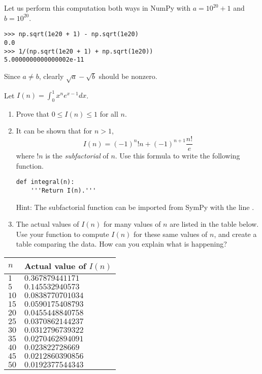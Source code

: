 Let us perform this computation both ways in NumPy with $a=10^20+1$ and $b=10^20$.
\begin{lstlisting}
>>> np.sqrt(1e20 + 1) - np.sqrt(1e20)
0.0
>>> 1/(np.sqrt(1e20 + 1) + np.sqrt(1e20))
5.0000000000000002e-11
\end{lstlisting}
Since $a \neq b$, clearly $\sqrt{a}-\sqrt{b}$ should be nonzero.


\begin{problem}
Let $I(n) = \int_0^1 x^n e^{x - 1} dx$.
\begin{enumerate}
\item Prove that $0 \leq I(n) \leq 1$ for all $n$.
\item It can be shown that for $n>1$,
\[
I(n) = \left(-1\right)^{n} !n + \left(-1\right)^{n + 1} \frac{n!}{e}
\]
where $!n$ is the \emph{subfactorial} of $n$.
Use this formula to write the following function.
\begin{lstlisting}
def integral(n):
    '''Return I(n).'''
\end{lstlisting}
Hint: The subfactorial function can be imported from SymPy with the line .
\item The actual values of $I(n)$ for many values of $n$ are listed in the table below.
Use your function  to compute $I(n)$ for these same values of $n$, and create a table comparing the data.
How can you explain what is happening?
\end{enumerate}

\begin{center}
\begin{tabular}{|l|l|}
\hline
$n$  & Actual value of $I(n)$ \\
\hline
$1$  & $0.367879441171$ \\
$5$  & $0.145532940573$ \\
$10$ & $0.0838770701034$ \\
$15$ & $0.0590175408793$ \\
$20$ & $0.0455448840758$ \\
$25$ & $0.0370862144237$ \\
$30$ & $0.0312796739322$ \\
$35$ & $0.0270462894091$ \\
$40$& $0.023822728669$ \\
$45$& $0.0212860390856$ \\
$50$ & $0.0192377544343$ \\
\hline
\end{tabular}
\end{center}

\end{problem}


